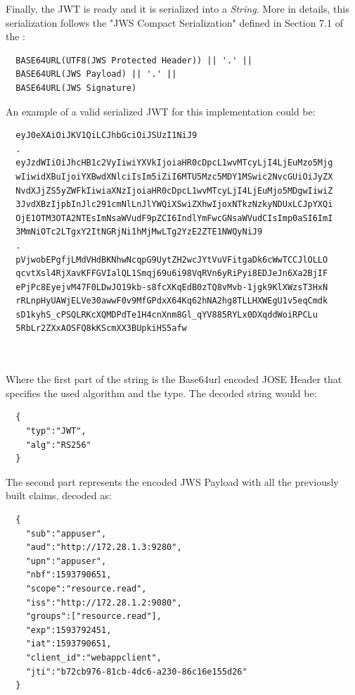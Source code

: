 \noindent Finally, the JWT is ready and it is serialized into a \textit{String}. More in details, this serialization follows the "JWS Compact Serialization" defined in Section 7.1 of the  \cite{RFC7515}:

\begin{lstlisting}
  BASE64URL(UTF8(JWS Protected Header)) || '.' ||
  BASE64URL(JWS Payload) || '.' ||
  BASE64URL(JWS Signature)
\end{lstlisting}

\noindent An example of a valid serialized JWT for this implementation could be:

\begin{lstlisting}
  eyJ0eXAiOiJKV1QiLCJhbGciOiJSUzI1NiJ9
  .
  eyJzdWIiOiJhcHB1c2VyIiwiYXVkIjoiaHR0cDpcL1wvMTcyLjI4LjEuMzo5Mjg
  wIiwidXBuIjoiYXBwdXNlciIsIm5iZiI6MTU5Mzc5MDY1MSwic2NvcGUiOiJyZX
  NvdXJjZS5yZWFkIiwiaXNzIjoiaHR0cDpcL1wvMTcyLjI4LjEuMjo5MDgwIiwiZ
  3JvdXBzIjpbInJlc291cmNlLnJlYWQiXSwiZXhwIjoxNTkzNzkyNDUxLCJpYXQi
  OjE1OTM3OTA2NTEsImNsaWVudF9pZCI6IndlYmFwcGNsaWVudCIsImp0aSI6ImI
  3MmNiOTc2LTgxY2ItNGRjNi1hMjMwLTg2YzE2ZTE1NWQyNiJ9
  .
  pVjwobEPgfjLMdVHdBKNhwNcqpG9UytZH2wcJYtVuVFitgaDk6cWwTCCJlOLLO
  qcvtXsl4RjXavKFFGVIalQL1Smqj69u6i98VqRVn6yRiPyi8EDJeJn6Xa2BjIF
  ePjPc8EyejvM47F0LDwJO19kb-s8fcXKqEdB0zTQ8vMvb-1jgk9KlXWzsT3HxN
  rRLnpHyUAWjELVe30awwF0v9MfGPdxX64Kq62hNA2hg8TLLHXWEgU1v5eqCmdk
  sD1kyhS_cPSQLRKcXQMDPdTe1H4cnXnm8Gl_qYV885RYLx0DXqddWoiRPCLu
  5RbLr2ZXxAOSFQ8kKScmXX3BUpkiHS5afw

  
\end{lstlisting}

\noindent Where the first part of the string is the Base64url encoded JOSE Header that specifies the used algorithm and the type. The decoded string would be:

\begin{lstlisting}
  {
    "typ":"JWT",
    "alg":"RS256"
  }
\end{lstlisting}

\noindent The second part represents the encoded JWS Payload with all the previously built claims, decoded as:

\begin{lstlisting}
  {
    "sub":"appuser",
    "aud":"http://172.28.1.3:9280",
    "upn":"appuser",
    "nbf":1593790651,
    "scope":"resource.read",
    "iss":"http://172.28.1.2:9080",
    "groups":["resource.read"],
    "exp":1593792451,
    "iat":1593790651,
    "client_id":"webappclient",
    "jti":"b72cb976-81cb-4dc6-a230-86c16e155d26"
  }
\end{lstlisting}

